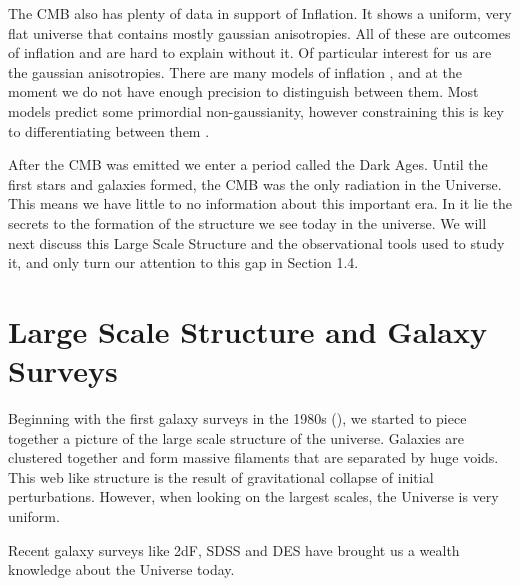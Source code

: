 The CMB also has plenty of data in support of Inflation. It shows a uniform, very flat universe that contains mostly gaussian anisotropies. All of these are outcomes of inflation and are hard to explain without it. Of particular interest for us are the gaussian anisotropies. There are many models of inflation , and at the moment we do not have enough precision to distinguish between them. Most models predict some primordial non-gaussianity, however constraining this is key to differentiating between them .

After the CMB was emitted we enter a period called the Dark Ages. Until the first stars and galaxies formed, the CMB was the only radiation in the Universe. This means we have little to no information about this important era. In it lie the secrets to the formation of the structure we see today in the universe. We will next discuss this Large Scale Structure and the observational tools used to study it, and only turn our attention to this gap in Section 1.4.

\section{Large Scale Structure and Galaxy Surveys}

Beginning with the first galaxy surveys in the 1980s (\cite{Davis_galaxy_survey}), we started to piece together a picture of the large scale structure of the universe. Galaxies are clustered together and form massive filaments that are separated by huge voids. This web like structure is the result of gravitational collapse of initial perturbations. However, when looking on the largest scales, the Universe is very uniform.

Recent galaxy surveys like 2dF, SDSS and DES  have brought us a wealth knowledge about the Universe today. 


